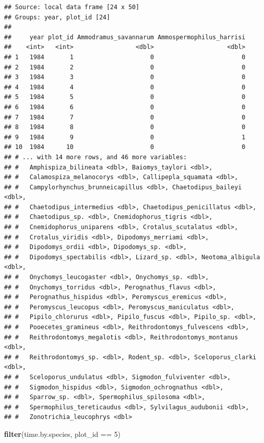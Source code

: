 \documentclass[]{article}
\newenvironment{Shaded}{\begin{snugshade}}{\end{snugshade}}
\newcommand{\KeywordTok}[1]{\textcolor[rgb]{0.13,0.29,0.53}{\textbf{{#1}}}}
\newcommand{\DecValTok}[1]{\textcolor[rgb]{0.00,0.00,0.81}{{#1}}}
\newcommand{\StringTok}[1]{\textcolor[rgb]{0.31,0.60,0.02}{{#1}}}
\newcommand{\NormalTok}[1]{{#1}}
\begin{document}
\begin{verbatim}
## Source: local data frame [24 x 50]
## Groups: year, plot_id [24]
## 
##     year plot_id Ammodramus_savannarum Ammospermophilus_harrisi
##    <int>   <int>                 <dbl>                    <dbl>
## 1   1984       1                     0                        0
## 2   1984       2                     0                        0
## 3   1984       3                     0                        0
## 4   1984       4                     0                        0
## 5   1984       5                     0                        0
## 6   1984       6                     0                        0
## 7   1984       7                     0                        0
## 8   1984       8                     0                        0
## 9   1984       9                     0                        1
## 10  1984      10                     0                        0
## # ... with 14 more rows, and 46 more variables:
## #   Amphispiza_bilineata <dbl>, Baiomys_taylori <dbl>,
## #   Calamospiza_melanocorys <dbl>, Callipepla_squamata <dbl>,
## #   Campylorhynchus_brunneicapillus <dbl>, Chaetodipus_baileyi <dbl>,
## #   Chaetodipus_intermedius <dbl>, Chaetodipus_penicillatus <dbl>,
## #   Chaetodipus_sp. <dbl>, Cnemidophorus_tigris <dbl>,
## #   Cnemidophorus_uniparens <dbl>, Crotalus_scutalatus <dbl>,
## #   Crotalus_viridis <dbl>, Dipodomys_merriami <dbl>,
## #   Dipodomys_ordii <dbl>, Dipodomys_sp. <dbl>,
## #   Dipodomys_spectabilis <dbl>, Lizard_sp. <dbl>, Neotoma_albigula <dbl>,
## #   Onychomys_leucogaster <dbl>, Onychomys_sp. <dbl>,
## #   Onychomys_torridus <dbl>, Perognathus_flavus <dbl>,
## #   Perognathus_hispidus <dbl>, Peromyscus_eremicus <dbl>,
## #   Peromyscus_leucopus <dbl>, Peromyscus_maniculatus <dbl>,
## #   Pipilo_chlorurus <dbl>, Pipilo_fuscus <dbl>, Pipilo_sp. <dbl>,
## #   Pooecetes_gramineus <dbl>, Reithrodontomys_fulvescens <dbl>,
## #   Reithrodontomys_megalotis <dbl>, Reithrodontomys_montanus <dbl>,
## #   Reithrodontomys_sp. <dbl>, Rodent_sp. <dbl>, Sceloporus_clarki <dbl>,
## #   Sceloporus_undulatus <dbl>, Sigmodon_fulviventer <dbl>,
## #   Sigmodon_hispidus <dbl>, Sigmodon_ochrognathus <dbl>,
## #   Sparrow_sp. <dbl>, Spermophilus_spilosoma <dbl>,
## #   Spermophilus_tereticaudus <dbl>, Sylvilagus_audubonii <dbl>,
## #   Zonotrichia_leucophrys <dbl>
\end{verbatim}

\begin{Shaded}
\begin{Highlighting}[]
\KeywordTok{filter}\NormalTok{(time.by.species, plot_id ==}\StringTok{ }\DecValTok{5}\NormalTok{)}
\end{Highlighting}
\end{Shaded}
\end{document}
